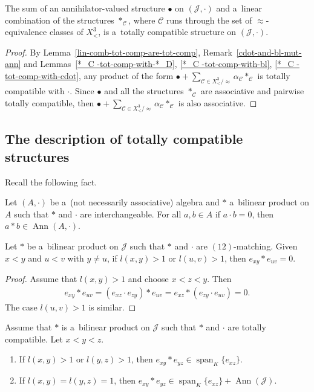 \documentclass{jonasart}
\newcommand{\af}{\alpha}
\newcommand{\bl}{\bullet}
\newcommand{\C}{\mathcal{C}}
\newcommand{\J}{\mathcal{J}}
\DeclareMathOperator{\Ann}{Ann}
\DeclareMathOperator{\spn}{span}
\begin{document}
	\begin{proposition}\label{bl+lin-comb-*_C -tot-comp}
		The sum of an annihilator-valued structure $\bl$ on $(\J,\cdot)$ and a~linear combination of the structures $*_\C$, where $\C$ runs through the set of $\approx$-equivalence classes of $X^3_<$, is a~totally compatible structure on $(\J,\cdot)$.
	\end{proposition}

	\begin{proof}
		By Lemma~\ref{lin-comb-tot-comp-are-tot-comp}, Remark~\ref{cdot-and-bl-mut-ann} and Lemmas~\ref{*_C -tot-comp-with-*_D}, \ref{*_C -tot-comp-with-bl}, \ref{*_C -tot-comp-with-cdot}, any product of the form $\bl+\sum_{\C\in X^3_< /{\approx}}\af_\C *_\C$ is totally compatible with $\cdot$. Since $\bl$ and all the structures $*_\C$ are associative and pairwise totally compatible, then $\bl+\sum_{\C\in X^3_< /{\approx}}\af_\C *_\C$ is also associative.
	\end{proof}

	\subsection{The description of totally compatible structures}

	Recall the following fact.
	\begin{lemma}
		\label{a-cdot-b=0=>a*b-in-Ann(A)}
		Let $(A,\cdot)$ be a~(not necessarily associative) algebra and $*$ a~bilinear product on $A$ such that $*$ and $\cdot$ are interchangeable. For all $a,b\in A$ if $a\cdot b=0$, then $a*b\in\Ann(A,\cdot)$.
	\end{lemma}

	\begin{lemma}\label{e_x y*e_u v=0-for-y-ne-u-and-l(x_y )>1-or-l(u_v )>1}
		Let $*$ be a~bilinear product on $\J$ such that $*$ and $\cdot$ are $(12)$-matching. Given $x<y$ and $u<v$ with $y\ne u$, if $l(x,y)>1$ or $l(u,v)>1$, then $e_{xy}*e_{uv}=0$.
	\end{lemma}

	\begin{proof}
		Assume that $l(x,y)>1$ and choose $x<z<y$. Then
		\begin{align*}
			e_{xy}*e_{uv}=(e_{xz}\cdot e_{zy})*e_{uv}=e_{xz}*(e_{zy}\cdot e_{uv})=0.
		\end{align*}
		The case $l(u,v)>1$ is similar.
	\end{proof}

	\begin{lemma}\label{e_x y*e_y z-in-span-e_x z+Ann}
		Assume that $*$ is a~bilinear product on $\J$ such that $*$ and $\cdot$ are totally compatible. Let $x<y<z$.
		\begin{enumerate}
			\item\label{e_x y*e_y z-l(x_y )>1-or-l(y_z )>1} If $l(x,y)>1$ or $l(y,z)>1$, then $e_{xy}*e_{yz}\in\spn_K\{e_{xz}\}$.
			\item\label{e_x y*e_y z-l(x_y )=l(y_z )=1} If $l(x,y)=l(y,z)=1$, then $e_{xy}*e_{yz}\in\spn_K\{e_{xz}\}+\Ann(\J)$.
		\end{enumerate}
	\end{lemma}
\end{document}
